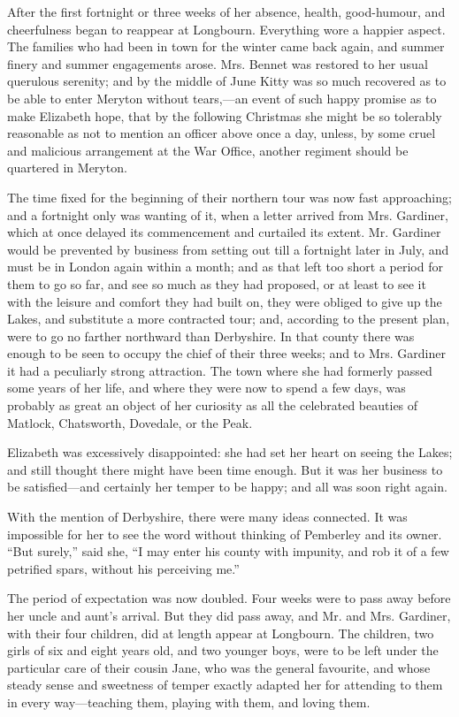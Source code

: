 \documentclass[10pt]{book}
\begin{document}
   After the first fortnight or three weeks of her absence, health,
good-humour, and cheerfulness began to reappear at Longbourn. Everything
wore a happier aspect. The families who had been in town for the winter
came back again, and summer finery and summer engagements arose. Mrs.
Bennet was restored to her usual querulous serenity; and by the middle
of June Kitty was so much recovered as to be able to enter Meryton
without tears,—an event of such happy promise as to make Elizabeth
hope, that by the following Christmas she might be so tolerably
reasonable as not to mention an officer above once a day, unless, by
some cruel and malicious arrangement at the War Office, another regiment
should be quartered in Meryton.
  

   The time fixed for the beginning of their northern tour was now fast
approaching; and a fortnight only was wanting of it, when a letter
arrived from Mrs. Gardiner, which at once delayed its commencement and
curtailed its extent. Mr. Gardiner would be prevented by business from
setting out till a fortnight later in July,
   and must be in London again
within a month; and as that left too short a period for them to go so
far, and see so much as they had proposed, or at least to see it with
the leisure and comfort they had built on, they were obliged to give up
the Lakes, and substitute a more contracted tour; and, according to the
present plan, were to go no farther northward than Derbyshire. In that
county there was enough to be seen to occupy the chief of their three
weeks; and to Mrs. Gardiner it had a peculiarly strong attraction. The
town where she had formerly passed some years of her life, and where
they were now to spend a few days, was probably as great an object of
her curiosity as all the celebrated beauties of Matlock, Chatsworth,
Dovedale, or the Peak.
  

   Elizabeth was excessively disappointed: she had set her heart on seeing
the Lakes; and still thought there might have been time enough. But it
was her business to be satisfied—and certainly her temper to be happy;
and all was soon right again.
  

   With the mention of Derbyshire, there were many ideas connected. It was
impossible for her to see the word without thinking of Pemberley and its
owner. “But surely,” said she, “I may enter his county with impunity,
and rob it of a few petrified spars, without his perceiving me.”
  

   The period of expectation was now doubled. Four weeks were to pass away
before her uncle and aunt’s arrival. But they did pass away, and Mr. and
Mrs. Gardiner, with their four children, did at length appear at
Longbourn. The children, two girls of six and eight years old, and two
younger boys, were to be left under the particular care of their cousin
Jane, who was the general favourite, and whose steady sense and
sweetness
   of temper exactly adapted her for attending to them in every
way—teaching them, playing with them, and loving them.
  
\end{document}
